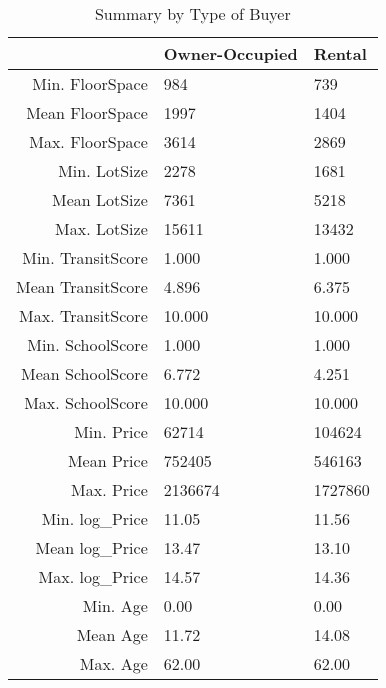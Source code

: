 \begin{table}[ht]
\centering
\begin{tabular}{rll}
  \hline
 & Owner-Occupied & Rental \\ 
  \hline
Min. FloorSpace &  984 &  739 \\ 
  Mean FloorSpace & 1997 & 1404 \\ 
  Max. FloorSpace & 3614 & 2869 \\ 
  Min. LotSize &  2278 &  1681 \\ 
  Mean LotSize &  7361 &  5218 \\ 
  Max. LotSize & 15611 & 13432 \\ 
  Min. TransitScore &  1.000 &  1.000 \\ 
  Mean TransitScore &  4.896 &  6.375 \\ 
  Max. TransitScore & 10.000 & 10.000 \\ 
  Min. SchoolScore &  1.000 &  1.000 \\ 
  Mean SchoolScore &  6.772 &  4.251 \\ 
  Max. SchoolScore & 10.000 & 10.000 \\ 
  Min. Price &   62714 &  104624 \\ 
  Mean Price &  752405 &  546163 \\ 
  Max. Price & 2136674 & 1727860 \\ 
  Min. log\_Price & 11.05 & 11.56 \\ 
  Mean log\_Price & 13.47 & 13.10 \\ 
  Max. log\_Price & 14.57 & 14.36 \\ 
  Min. Age &  0.00 &  0.00 \\ 
  Mean Age & 11.72 & 14.08 \\ 
  Max. Age & 62.00 & 62.00 \\ 
   \hline
\end{tabular}
\caption{Summary by Type of Buyer} 
\label{tab:summ_by_buyer}
\end{table}

